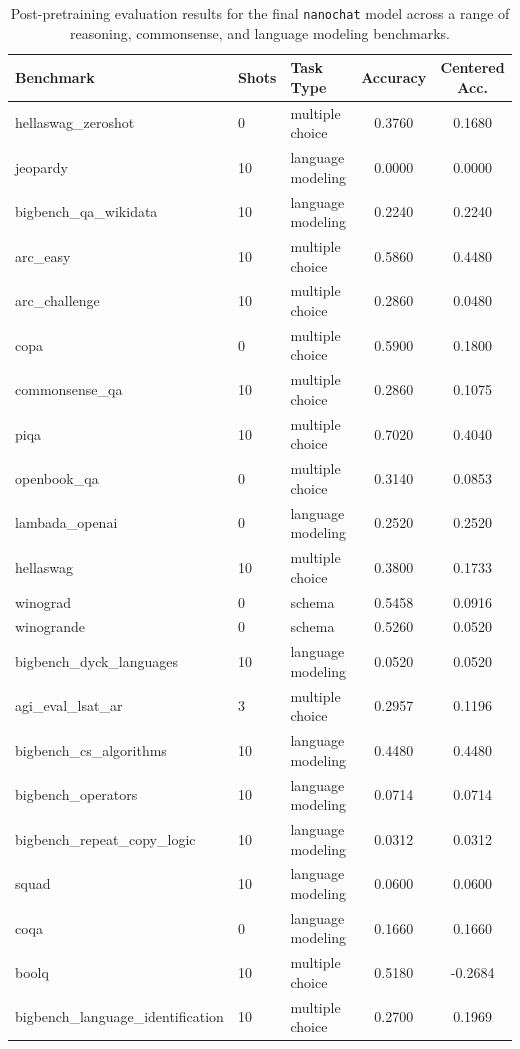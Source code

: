 \documentclass[a4paper,12pt]{article}
\begin{document}
\begin{table}[h]
\centering
\begin{tabular}{l l l c c}
\hline
Benchmark & Shots & Task Type & Accuracy & Centered Acc. \\
\hline
hellaswag\_zeroshot & 0 & multiple choice & 0.3760 & 0.1680 \\
jeopardy & 10 & language modeling & 0.0000 & 0.0000 \\
bigbench\_qa\_wikidata & 10 & language modeling & 0.2240 & 0.2240 \\
arc\_easy & 10 & multiple choice & 0.5860 & 0.4480 \\
arc\_challenge & 10 & multiple choice & 0.2860 & 0.0480 \\
copa & 0 & multiple choice & 0.5900 & 0.1800 \\
commonsense\_qa & 10 & multiple choice & 0.2860 & 0.1075 \\
piqa & 10 & multiple choice & 0.7020 & 0.4040 \\
openbook\_qa & 0 & multiple choice & 0.3140 & 0.0853 \\
lambada\_openai & 0 & language modeling & 0.2520 & 0.2520 \\
hellaswag & 10 & multiple choice & 0.3800 & 0.1733 \\
winograd & 0 & schema & 0.5458 & 0.0916 \\
winogrande & 0 & schema & 0.5260 & 0.0520 \\
bigbench\_dyck\_languages & 10 & language modeling & 0.0520 & 0.0520 \\
agi\_eval\_lsat\_ar & 3 & multiple choice & 0.2957 & 0.1196 \\
bigbench\_cs\_algorithms & 10 & language modeling & 0.4480 & 0.4480 \\
bigbench\_operators & 10 & language modeling & 0.0714 & 0.0714 \\
bigbench\_repeat\_copy\_logic & 10 & language modeling & 0.0312 & 0.0312 \\
squad & 10 & language modeling & 0.0600 & 0.0600 \\
coqa & 0 & language modeling & 0.1660 & 0.1660 \\
boolq & 10 & multiple choice & 0.5180 & -0.2684 \\
bigbench\_language\_identification & 10 & multiple choice & 0.2700 & 0.1969 \\
\hline
\end{tabular}
\caption{Post-pretraining evaluation results for the final \texttt{nanochat} model across a range of reasoning, commonsense, and language modeling benchmarks.}
\label{tab:nanochat_eval}
\end{table}
\end{document}
